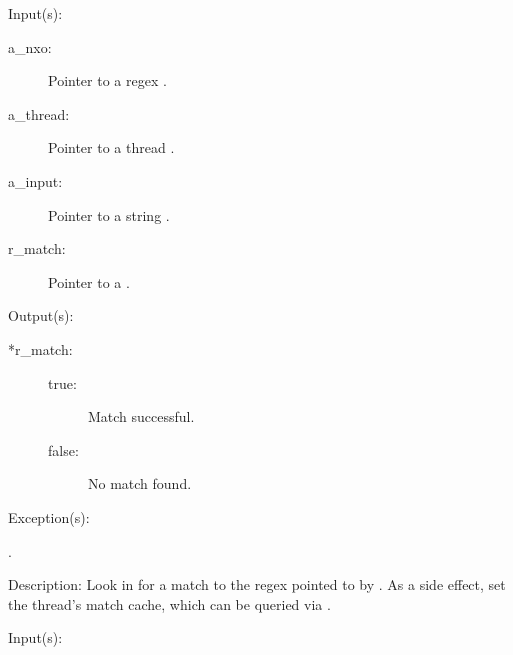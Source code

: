 \begin{capi}
\label{nxo_regex_match}
	\begin{capilist}
	\item[Input(s): ]
		\begin{description}\item[]
		\item[a\_nxo: ]
			Pointer to a regex .
		\item[a\_thread: ]
			Pointer to a thread .
		\item[a\_input: ]
			Pointer to a string .
		\item[r\_match: ]
			Pointer to a .
		\end{description}
	\item[Output(s): ]
		\begin{description}\item[]
		\item[*r\_match: ]
			\begin{description}\item[]
			\item[true: ] Match successful.
			\item[false: ] No match found.
			\end{description}
		\end{description}
	\item[Exception(s): ]
		\begin{description}\item[]
		\item[.]
		\end{description}
	\item[Description: ]
		Look in  for a match to the regex pointed to by
		.  As a side effect, set the thread's match cache,
		which can be queried via .
	\end{capilist}
\label{nxo_regex_nonew_match}
	\begin{capilist}
	\item[Input(s): ]
		\begin{description}\item[]

\end{description}
\end{capilist}
\end{capi}
